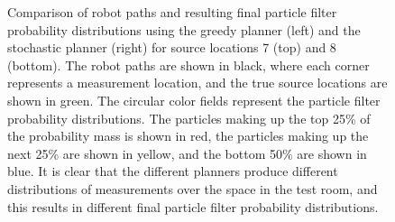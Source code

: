 \documentclass[submit, 12pt]{aiaa-pretty-modified}
\begin{document}
\begin{figure}
\begin{center}
\caption[Final posterior estimates for source locations 7 and 8]{Comparison of robot paths and resulting final particle filter
  probability distributions using the greedy planner (left) and the
  stochastic planner (right) for source locations 7 (top) and 8 (bottom). The
  robot paths are shown in black, where each corner represents a
  measurement location, and the true source locations are
  shown in green.  The circular color fields represent the particle
  filter probability distributions.  The particles making up the top 25\% of the
  probability mass is shown in red, the particles making up the next
  25\% are shown in yellow, and the bottom 50\% are shown in blue. It
  is clear that the different planners produce different distributions
of measurements over the space in the test room, and this results in
different final particle filter probability distributions.}
\label{fig:paths}
\end{center}
\end{figure}
\end{document}
